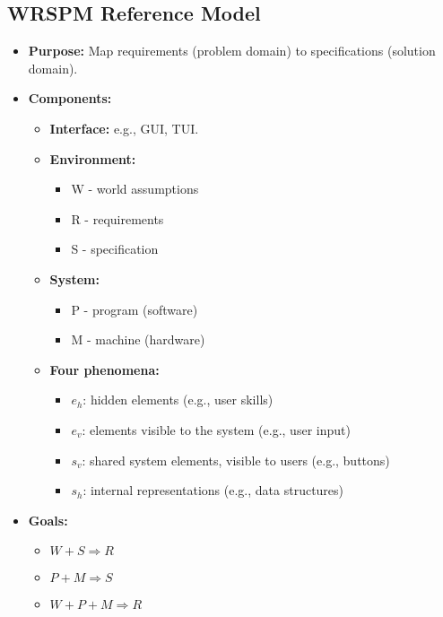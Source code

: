 \documentclass[11pt,a4paper]{article}
\begin{document}
\subsection*{WRSPM Reference Model}
\begin{itemize}
    \item \textbf{Purpose:} Map requirements (problem domain) to specifications (solution domain).
    \item \textbf{Components:}
        \begin{itemize}
            \item \textbf{Interface:} e.g., GUI, TUI.
            \item \textbf{Environment:}
                \begin{itemize}
                    \item W - world assumptions
                    \item R - requirements
                    \item S - specification
                \end{itemize}
            \item \textbf{System:}
                \begin{itemize}
                    \item P - program (software)
                    \item M - machine (hardware)
                \end{itemize}
            \item \textbf{Four phenomena:}
                \begin{itemize}
                    \item $e_h$: hidden elements (e.g., user skills)
                    \item $e_v$: elements visible to the system (e.g., user input)
                    \item $s_v$: shared system elements, visible to users (e.g., buttons)
                    \item $s_h$: internal representations (e.g., data structures)
                \end{itemize}
        \end{itemize}
    \item \textbf{Goals:}
        \begin{itemize}
            \item $W + S \Rightarrow R$
            \item $P + M \Rightarrow S$
            \item $W + P + M \Rightarrow R$
        \end{itemize}
\end{itemize}
\end{document}
